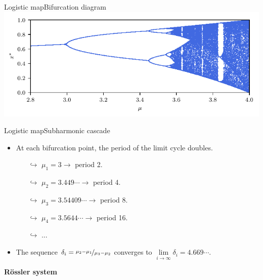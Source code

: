 \documentclass[usenames,dvipsnames,svgnames,10pt,aspectratio=169]{beamer}
\begin{document}
\begin{frame}[t, c]{Logistic map}{Bifurcation diagram}
	\centering
	\includegraphics[width=.75\textwidth]{logistic_map_bifurcation_zoom_1}

	\vspace{1cm}
\end{frame}

\begin{frame}[t, c]{Logistic map}{Subharmonic cascade}
	\begin{itemize}
		\item At each bifurcation point, the period of the limit cycle doubles.
		\begin{itemize}
			\item[$\hookrightarrow$] $\mu_1 = 3 \to$ period 2.
			\item[$\hookrightarrow$] $\mu_2 = 3.449\cdots \to$ period 4.
			\item[$\hookrightarrow$] $\mu_3 = 3.54409\cdots \to$ period 8.
			\item[$\hookrightarrow$] $\mu_4 = 3.5644\cdots \to$ period 16.
			\item[$\hookrightarrow$] ...
		\end{itemize}

		\bigskip

		\item The sequence $\delta_i = \nicefrac{\mu_2 - \mu_1}{\mu_3 - \mu_2}$ converges to $\lim \limits_{i \to \infty} \delta_i = 4.669\cdots$.
	\end{itemize}

	\vspace{1cm}
\end{frame}

\begin{frame}[t, c]{}
	\centering
	\vspace{1cm}

	{\Large \textbf{R\"ossler system}}

	\bigskip

	{}

\end{frame}
\end{document}
